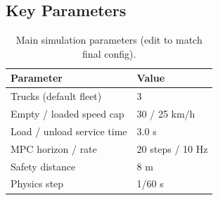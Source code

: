 \subsection{Key Parameters}
\begin{table}[t]
  \centering
  \caption{Main simulation parameters (edit to match final config).}
  \label{tab:sim-params}
  \begin{tabular}{ll}
    \toprule
    Parameter & Value \\
    \midrule
    Trucks (default fleet)      & 3 \\
    Empty / loaded speed cap    & 30 / 25 km/h \\
    Load / unload service time  & 3.0 s \\
    MPC horizon / rate          & 20 steps / 10 Hz \\
    Safety distance             & 8 m \\
    Physics step                & 1/60 s \\
    \bottomrule
  \end{tabular}
\end{table}
